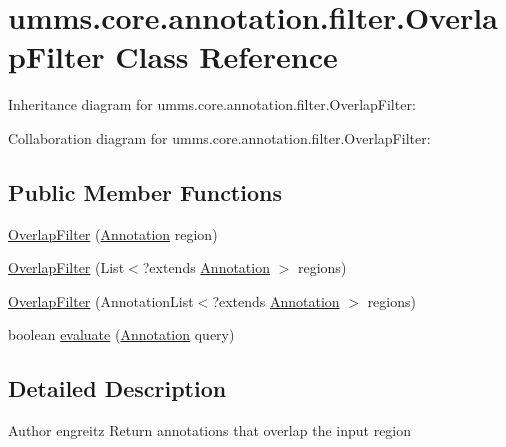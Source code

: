 \hypertarget{classumms_1_1core_1_1annotation_1_1filter_1_1_overlap_filter}{\section{umms.\+core.\+annotation.\+filter.\+Overlap\+Filter Class Reference}
\label{classumms_1_1core_1_1annotation_1_1filter_1_1_overlap_filter}
}


Inheritance diagram for umms.\+core.\+annotation.\+filter.\+Overlap\+Filter\+:


Collaboration diagram for umms.\+core.\+annotation.\+filter.\+Overlap\+Filter\+:
\subsection*{Public Member Functions}
\begin{DoxyCompactItemize}
\item 
\hyperlink{classumms_1_1core_1_1annotation_1_1filter_1_1_overlap_filter_ad9bacdcab80ac43d4a114294407887fb}{Overlap\+Filter} (\hyperlink{interfaceumms_1_1core_1_1annotation_1_1_annotation}{Annotation} region)
\item 
\hyperlink{classumms_1_1core_1_1annotation_1_1filter_1_1_overlap_filter_a4f02bd9e6fe276b7c8b5e0546488074a}{Overlap\+Filter} (List$<$?extends \hyperlink{interfaceumms_1_1core_1_1annotation_1_1_annotation}{Annotation} $>$ regions)
\item 
\hyperlink{classumms_1_1core_1_1annotation_1_1filter_1_1_overlap_filter_ab05eaa5a5b4ad22e9b3ccfbf5d5cd59d}{Overlap\+Filter} (Annotation\+List$<$?extends \hyperlink{interfaceumms_1_1core_1_1annotation_1_1_annotation}{Annotation} $>$ regions)
\item 
boolean \hyperlink{classumms_1_1core_1_1annotation_1_1filter_1_1_overlap_filter_ad907ec9d89dfd65dee9fd0ac0732b93b}{evaluate} (\hyperlink{interfaceumms_1_1core_1_1annotation_1_1_annotation}{Annotation} query)
\end{DoxyCompactItemize}


\subsection{Detailed Description}
\begin{DoxyAuthor}{Author}
engreitz Return annotations that overlap the input region 
\end{DoxyAuthor}


